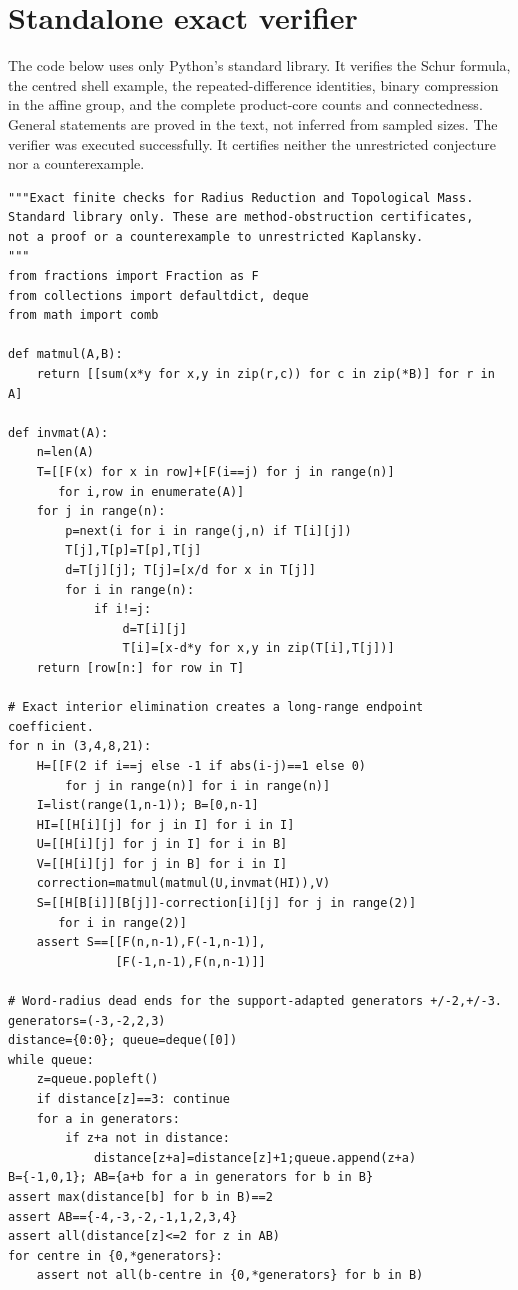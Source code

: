 \documentclass[11pt,a4paper,oneside]{report}
\theoremstyle{definition}
\theoremstyle{remark}
\begin{document}
\endgroup


\section{Standalone exact verifier}
The code below uses only Python's standard library.
It verifies the Schur formula, the centred shell example,
the repeated-difference identities, binary compression
in the affine group, and the complete product-core
counts and connectedness. General statements are
proved in the text, not inferred from sampled sizes.
The verifier was executed successfully. It certifies
neither the unrestricted conjecture nor a counterexample.

\begin{lstlisting}
"""Exact finite checks for Radius Reduction and Topological Mass.
Standard library only. These are method-obstruction certificates,
not a proof or a counterexample to unrestricted Kaplansky.
"""
from fractions import Fraction as F
from collections import defaultdict, deque
from math import comb

def matmul(A,B):
    return [[sum(x*y for x,y in zip(r,c)) for c in zip(*B)] for r in A]

def invmat(A):
    n=len(A)
    T=[[F(x) for x in row]+[F(i==j) for j in range(n)]
       for i,row in enumerate(A)]
    for j in range(n):
        p=next(i for i in range(j,n) if T[i][j])
        T[j],T[p]=T[p],T[j]
        d=T[j][j]; T[j]=[x/d for x in T[j]]
        for i in range(n):
            if i!=j:
                d=T[i][j]
                T[i]=[x-d*y for x,y in zip(T[i],T[j])]
    return [row[n:] for row in T]

# Exact interior elimination creates a long-range endpoint coefficient.
for n in (3,4,8,21):
    H=[[F(2 if i==j else -1 if abs(i-j)==1 else 0)
        for j in range(n)] for i in range(n)]
    I=list(range(1,n-1)); B=[0,n-1]
    HI=[[H[i][j] for j in I] for i in I]
    U=[[H[i][j] for j in I] for i in B]
    V=[[H[i][j] for j in B] for i in I]
    correction=matmul(matmul(U,invmat(HI)),V)
    S=[[H[B[i]][B[j]]-correction[i][j] for j in range(2)]
       for i in range(2)]
    assert S==[[F(n,n-1),F(-1,n-1)],
               [F(-1,n-1),F(n,n-1)]]

# Word-radius dead ends for the support-adapted generators +/-2,+/-3.
generators=(-3,-2,2,3)
distance={0:0}; queue=deque([0])
while queue:
    z=queue.popleft()
    if distance[z]==3: continue
    for a in generators:
        if z+a not in distance:
            distance[z+a]=distance[z]+1;queue.append(z+a)
B={-1,0,1}; AB={a+b for a in generators for b in B}
assert max(distance[b] for b in B)==2
assert AB=={-4,-3,-2,-1,1,2,3,4}
assert all(distance[z]<=2 for z in AB)
for centre in {0,*generators}:
    assert not all(b-centre in {0,*generators} for b in B)


\end{lstlisting}
\end{document}
